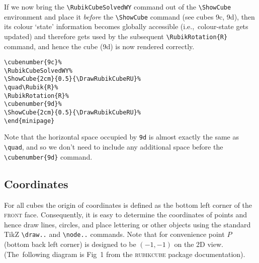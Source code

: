 \documentclass[a4paper]{article}
\newcommand{\cubenumber}[1]{\strut\raisebox{1cm}{#1}}
\begin{document}
\bigskip

If we now bring the \verb!\RubikCubeSolvedWY! command out of the \verb!\ShowCube! 
environment and place it \textit{before} the  \verb!\ShowCube! command (see cubes 9c, 9d), 
then its colour `state' information  becomes globally accessible (i.e.,~colour-state 
gets updated) and therefore  gets used by the subsequent  \verb!\RubikRotation{R}! 
command, and  hence the cube (9d)  is now rendered correctly.

\bigskip

\noindent%
\cubenumber{9c}%
\RubikCubeSolvedWY%
%
\quad{}%
%
\cubenumber{9d}%
%
\hspace{5mm}
\begin{minipage}{0.5\textwidth}
\begin{verbatim}
\cubenumber{9c}%
\RubikCubeSolvedWY%
\ShowCube{2cm}{0.5}{\DrawRubikCubeRU}%
\quad\Rubik{R}%
\RubikRotation{R}%
\cubenumber{9d}%
\ShowCube{2cm}{0.5}{\DrawRubikCubeRU}%
\end{minipage}
\end{verbatim}
\end{minipage}

\bigskip

Note that the horizontal space occupied by \texttt{9d} is almost exactly 
the same as \verb!\quad!, and so we don't need to include any additional 
space before the \verb!\cubenumber{9d}! command.



\pagebreak
\subsection{Coordinates}


For all cubes the origin of coordinates is defined as the bottom left corner of 
the \textsc{front} face. Consequently, it is easy to determine the coordinates 
of points and hence draw lines, circles, and place lettering or other objects 
using the standard TikZ \verb!\draw..! and \verb!\node..! commands. Note that for 
convenience  point $P$ (bottom back left corner) is designed to be $(-1,-1)$ 
on the 2D view. (The~following diagram  is Fig~1 from the \textsc{rubikcube} 
package documentation).
\end{document}
